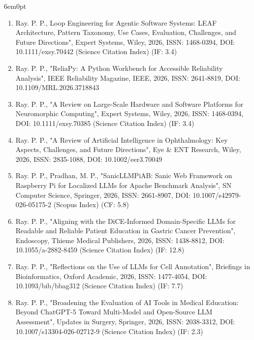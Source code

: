 \documentclass[11pt,a4paper]{moderncv}
\begin{document}
\begin{adjustwidth}{6em}{0pt}
	\begin{enumerate}
		
		
		\item Ray. P. P., Loop Engineering for Agentic Software Systems: LEAF Architecture, Pattern Taxonomy, Use Cases, Evaluation, Challenges, and Future Directions", Expert Systems, Wiley, 2026, ISSN: 1468-0394, DOI:   10.1111/exsy.70442 (Science Citation Index) (IF: 3.4)
		
		\item Ray. P. P., "ReliaPy: A Python Workbench for Accessible Reliability Analysis", IEEE Reliability Magazine, IEEE, 2026, ISSN: 2641-8819, DOI: 10.1109/MRL.2026.3718843

		\item Ray. P. P., "A Review on Large-Scale Hardware and Software Platforms for Neuromorphic Computing", Expert Systems, Wiley, 2026, ISSN: 1468-0394, DOI: 10.1111/exsy.70385  (Science Citation Index) (IF: 3.4) 
		
		\item Ray. P. P., "A Review of Artificial Intelligence in Ophthalmology: Key Aspects, Challenges, and Future Directions", Eye \& ENT Research, Wiley, 2026, ISSN: 2835-1088, DOI: 10.1002/eer3.70049
				
		\item Ray. P. P., Pradhan, M. P., "SanicLLMPiAB: Sanic Web Framework on Raspberry Pi for Localized LLMs for Apache Benchmark Analysis", SN Computer Science, Springer, 2026, ISSN: 2661-8907, DOI: 10.1007/s42979-026-05175-2 (Scopus Index) (CF: 5.8) 
		
		\item Ray. P. P., "Aligning with the DiCE-Informed Domain-Specific LLMs for Readable and Reliable Patient Education in Gastric Cancer Prevention", Endoscopy, Thieme Medical Publishers, 2026, ISSN: 1438-8812, DOI: 10.1055/a-2882-8459  (Science Citation Index) (IF: 12.8) 

		\item Ray. P. P., "Reflections on the Use of LLMs for Cell Annotation", Briefings in Bioinformatics, Oxford Academic, 2026, ISSN: 1477-4054, DOI: 10.1093/bib/bbag312 (Science Citation Index) (IF: 7.7) 
		
		\item Ray. P. P., "Broadening the Evaluation of AI Tools in Medical Education: Beyond ChatGPT-5 Toward Multi-Model and Open-Source LLM Assessment", Updates in Surgery, Springer, 2026, ISSN: 2038-3312, DOI: 10.1007/s13304-026-02712-9  (Science Citation Index) (IF: 2.3) 
		

\end{enumerate}
\end{adjustwidth}
\end{document}
